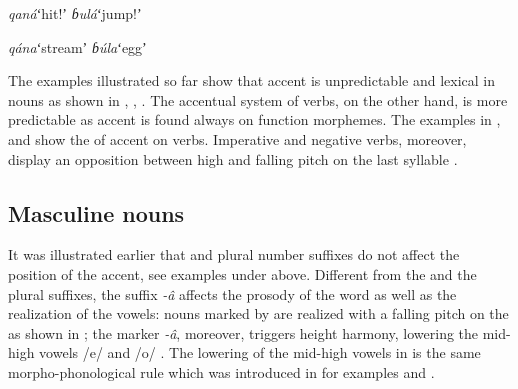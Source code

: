\documentclass[output=paper,modfonts,nonflat,hidelinks]{langsci/langscibook}
\begin{document}
\begin{exe}
\ex \label{ex:Petrollino:qanábulá} \begin{xlist}
\ex \textit{qaná}\hspace{15mm}ʻhit!ʼ
\ex \textit{ɓulá}\hspace{16mm}ʻjump!ʼ
\end{xlist}
\end{exe}

\begin{exe}
\ex \label{ex:Petrollino:qánabúla} \begin{xlist}
\ex \textit{qána}\hspace{15mm}ʻstreamʼ
\ex \textit{ɓúla}\hspace{16mm}ʻeggʼ
\end{xlist}
\end{exe}

The examples illustrated so far show that accent is unpredictable and lexical in nouns as shown in , , . The accentual system of  verbs, on the other hand, is more predictable as accent is found always on function morphemes. The examples in ,  and  show the  of accent on verbs. Imperative and negative verbs, moreover, display an opposition between high and falling pitch on the last syllable .  

\subsection{Masculine nouns} \label{sec:Petrollino:masculinenouns}

It was illustrated earlier that   and plural number suffixes do not affect the position of the accent, see examples under  above. Different from the  and the plural suffixes, the  suffix \textit{-â} affects the prosody of the word as well as the realization of the vowels: nouns marked by   are realized with a falling pitch on the  as shown in ; the   marker \textit{-â}, moreover, triggers height harmony, lowering the mid-high vowels /e/ and /o/ . The lowering of the mid-high vowels in  is the same morpho-phonological rule which was introduced in  for examples  and .
\end{document}
